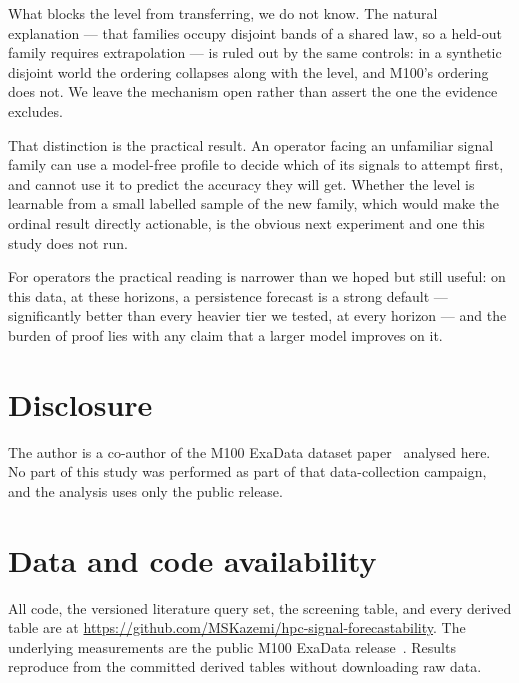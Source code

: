 \documentclass[11pt,a4paper]{article}
\begin{document}
What blocks the level from transferring, we do not know. The natural
explanation --- that families occupy disjoint bands of a shared law, so a
held-out family requires extrapolation --- is ruled out by the same controls:
in a synthetic disjoint world the ordering collapses along with the level, and
M100's ordering does not. We leave the mechanism open rather than assert the
one the evidence excludes.

That distinction is the practical result. An operator facing an unfamiliar
signal family can use a model-free profile to decide which of its signals to
attempt first, and cannot use it to predict the accuracy they will get. Whether
the level is learnable from a small labelled sample of the new family, which
would make the ordinal result directly actionable, is the obvious next
experiment and one this study does not run.

For operators the practical reading is narrower than we hoped but still useful:
on this data, at these horizons, a persistence forecast is a strong default ---
significantly better than every heavier tier we tested, at every horizon --- and
the burden of proof lies with any claim that a larger model improves on it.

\section*{Disclosure}

The author is a co-author of the M100 ExaData dataset paper~\citep{borghesi2023m100}
analysed here. No part of this study was performed as part of that data-collection
campaign, and the analysis uses only the public release.

\section*{Data and code availability}

All code, the versioned literature query set, the screening table, and every
derived table are at
\url{https://github.com/MSKazemi/hpc-signal-forecastability}. The underlying
measurements are the public M100 ExaData release~\citep{borghesi2023m100}.
Results reproduce from the committed derived tables without downloading raw
data.



\end{document}
